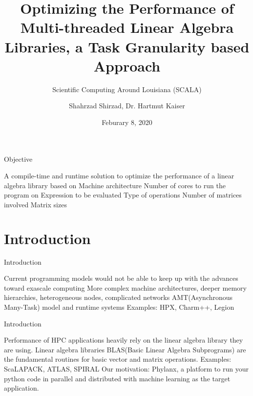 \documentclass[10pt]{beamer}
\title{Optimizing the Performance of Multi-threaded Linear Algebra Libraries, a Task Granularity based Approach }
\subtitle{Scientific Computing Around Louisiana (SCALA)}
\author{Shahrzad Shirzad, Dr. Hartmut Kaiser}
\date{Feburary 8, 2020}
\institute{Louisiana State University}
\begin{document}


\maketitle


\begin{frame}{Objective}
		\begin{outline}
			A compile-time and runtime solution to optimize the performance of a linear algebra library based on 
			\1Machine architecture
			\1Number of cores to run the program on
			\1Expression to be evaluated 
			\2Type of operations
			\2Number of matrices involved
			\2Matrix sizes
		\end{outline}		
\end{frame}

\section{Introduction}
\begin{frame}{Introduction}
	\begin{outline}
	\1Current programming models would not be able to keep up with the advances toward exascale computing 
	\2More complex machine architectures, deeper memory hierarchies, heterogeneous nodes, complicated networks
	\1AMT(Asynchronous Many-Task) model and runtime systems 		
	\2Examples: HPX, Charm++, Legion
	
	\end{outline}
\end{frame}

\begin{frame}{Introduction}
	\begin{outline}
	
\1Performance of HPC applications heavily rely on the linear algebra library they are using.
		\1Linear algebra libraries
		\2BLAS(Basic Linear Algebra Subprograms) are the fundamental routines for basic vector and matrix operations.
		\2Examples: ScaLAPACK, ATLAS, SPIRAL	
		\1Our motivation:
		\2Phylanx, a platform to run your python code in parallel and distributed with machine learning as the target application.
	\end{outline}
\end{frame}
\end{document}
